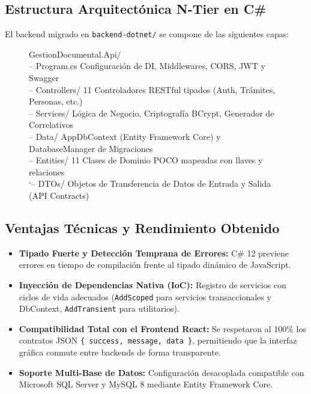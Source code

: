 \documentclass[a4paper,12pt]{article}
\newcommand{\dotnet}{\mbox{.NET}}
\begin{document}
\subsection{Estructura Arquitectónica N-Tier en C\#}
El backend migrado en \texttt{backend-dotnet/} se compone de las siguientes capas:

\begin{figure}[H]
\centering
\begin{tcolorbox}[
    colback=colorGrisFondo,
    colframe=colorAzul,
    arc=2mm,
    width=\linewidth,
    title={\small\bfseries\color{white}Topología Arquitectónica del Backend \dotnet{} 8 LTS}
]
\small\ttfamily
GestionDocumental.Api/\\
\textbar-- Program.cs \dotfill \textnormal{Configuración de DI, Middlewares, CORS, JWT y Swagger}\\
\textbar-- Controllers/ \dotfill \textnormal{11 Controladores RESTful tipados (Auth, Trámites, Personas, etc.)}\\
\textbar-- Services/ \dotfill \textnormal{Lógica de Negocio, Criptografía BCrypt, Generador de Correlativos}\\
\textbar-- Data/ \dotfill \textnormal{AppDbContext (Entity Framework Core) y DatabaseManager de Migraciones}\\
\textbar-- Entities/ \dotfill \textnormal{11 Clases de Dominio POCO mapeadas con llaves y relaciones}\\
\textquoteleft-- DTOs/ \dotfill \textnormal{Objetos de Transferencia de Datos de Entrada y Salida (API Contracts)}
\end{tcolorbox}
\end{figure}

\subsection{Ventajas Técnicas y Rendimiento Obtenido}
\begin{itemize}[leftmargin=1.5em]
    \item \textbf{Tipado Fuerte y Detección Temprana de Errores:} C\# 12 previene errores en tiempo de compilación frente al tipado dinámico de JavaScript.
    \item \textbf{Inyección de Dependencias Nativa (IoC):} Registro de servicios con ciclos de vida adecuados (\texttt{AddScoped} para servicios transaccionales y DbContext, \texttt{AddTransient} para utilitarios).
    \item \textbf{Compatibilidad Total con el Frontend React:} Se respetaron al 100\% los contratos JSON \texttt{\{ success, message, data \}}, permitiendo que la interfaz gráfica conmute entre backends de forma transparente.
    \item \textbf{Soporte Multi-Base de Datos:} Configuración desacoplada compatible con Microsoft SQL Server y MySQL 8 mediante Entity Framework Core.
\end{itemize}
\end{document}
